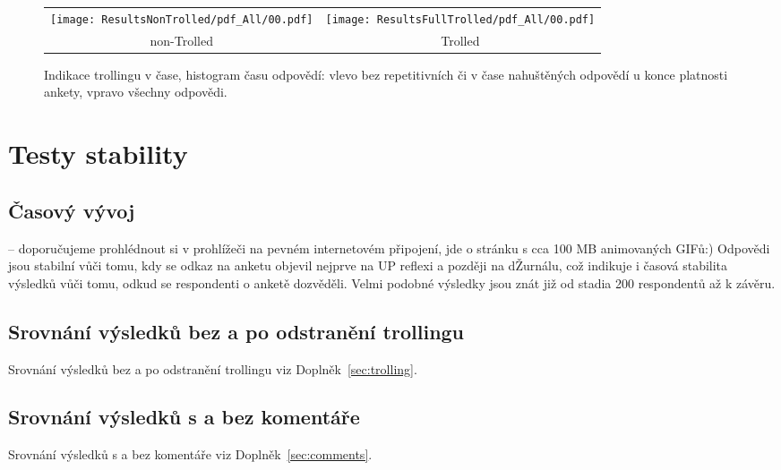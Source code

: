 \documentclass[a4paper,twoside]{article}
\begin{document}
\begin{figure}[!h]
\begin{tabular}{cc}
{  \texttt{[image: ResultsNonTrolled/pdf\_All/00.pdf]} } & 
{  \texttt{[image: ResultsFullTrolled/pdf\_All/00.pdf]}} \\
 non-Trolled & Trolled \\

\end{tabular}
\caption{Indikace trollingu v čase, histogram času odpovědí: vlevo bez repetitivních či v čase nahuštěných odpovědí u konce platnosti ankety, vpravo všechny odpovědi.}
\label{fig:troll_indication}
\end{figure}


\section{Testy stability}

\subsection{Časový vývoj}
 -- doporučujeme prohlédnout si v prohlížeči na pevném internetovém připojení, jde o stránku s cca 100 MB animovaných GIFů:) Odpovědi jsou stabilní vůči tomu, kdy se odkaz na anketu objevil nejprve na UP reflexi a později na dŽurnálu, což indikuje i časová stabilita výsledků vůči tomu, odkud se respondenti o anketě dozvěděli. Velmi podobné výsledky jsou znát již od stadia 200 respondentů až k závěru.

\subsection{Srovnání výsledků bez a po odstranění trollingu}
Srovnání výsledků bez a po odstranění trollingu viz Doplněk~\ref{sec:trolling}.

\subsection{Srovnání výsledků s a bez komentáře}
Srovnání výsledků s a bez komentáře viz Doplněk~\ref{sec:comments}.

\end{document}
